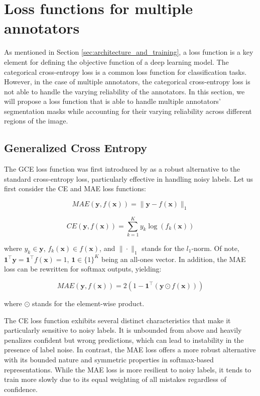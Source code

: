 \section{Loss functions for multiple annotators}

As mentioned in Section \ref{sec:architecture_and_training}, a loss
function is a key element for defining the objective function of a
deep learning model. The categorical cross-entropy loss is a common
loss function for classification tasks. However, in the case of
multiple annotators, the categorical cross-entropy loss is not able
to handle the varying reliability of the annotators. In this section,
we will propose a loss function that is able to handle multiple
annotators' segmentation masks while accounting for their varying reliability
across different regions of the image.

\subsection{Generalized Cross Entropy}

The \gls{GCE} loss function was first introduced by
\cite{ZhangEtAl2018} as a robust alternative to the standard
cross-entropy loss, particularly effective in handling noisy labels.
Let us first consider the \gls{CE} and \gls{MAE} loss functions:

\begin{equation}
  MAE(\mathbf{y}, f(\mathbf{x})) = \|\mathbf{y} - f(\mathbf{x})\|_1
\end{equation}

\begin{equation}
  CE(\mathbf{y}, f(\mathbf{x})) = \sum_{k=1}^K y_k \log(f_k(\mathbf{x}))
\end{equation}

where $y_k \in \mathbf{y}$, $f_k(\mathbf{x}) \in f(\mathbf{x})$, and
$\|\cdot\|_1$ stands for the $l_1$-norm. Of note,
$\mathbf{1}^\top\mathbf{y} = \mathbf{1}^\top f(\mathbf{x}) = 1$,
$\mathbf{1} \in \{1\}^K$ being an all-ones vector. In addition, the
MAE loss can be rewritten for softmax outputs, yielding:

\begin{equation}
  MAE(\mathbf{y}, f(\mathbf{x})) = 2(1 - \mathbf{1}^\top(\mathbf{y}
  \odot f(\mathbf{x})))
\end{equation}

where $\odot$ stands for the element-wise product.

The \gls{CE} loss function exhibits several distinct characteristics
that make it particularly sensitive to noisy labels. It is unbounded
from above and heavily penalizes confident but wrong predictions,
which can lead to instability in the presence of label noise. In
contrast, the \gls{MAE} loss offers a more robust alternative with
its bounded nature and symmetric properties in softmax-based
representations. While the MAE loss is more resilient to noisy
labels, it tends to train more slowly due to its equal weighting of
all mistakes regardless of confidence.

